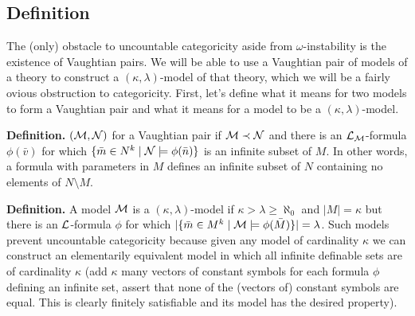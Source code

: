 \subsection{Definition}
The (only) obstacle to uncountable categoricity aside from \(\omega\)-instability is the existence of Vaughtian pairs.
We will be able to use a Vaughtian pair of models of a theory to construct a \((\kappa, \lambda)\)-model of that theory, which we will be a fairly ovious obstruction to categoricity.  
First, let's define what it means for two models to form a Vaughtian pair and what it means for a model to be a \((\kappa, \lambda)\)-model.

\textbf{Definition.} \((\mathcal{M}, \mathcal{N})\) for a Vaughtian pair if \(\mathcal{M} \prec \mathcal{N}\) and there is an \(\mathcal{L}_{\mathcal{M}}\)-formula \(\phi(\bar{v})\) for which
\(\{\bar{m} \in N^k \mid \mathcal{N} \models \phi(\bar{n})\}\) is an infinite subset of \(M\). 
In other words, a formula with parameters in \(M\) defines an infinite subset of \(N\) containing no elements of \(N \setminus M\).

\textbf{Definition.} A model \(\mathcal{M}\) is a \((\kappa, \lambda)\)-model if \(\kappa > \lambda \geq \aleph_0\) and \(|M| = \kappa\) but there is an \(\mathcal{L}\)-formula \(\phi\) for which
\(|\{\bar{m} \in M^k \mid \mathcal{M} \models \phi(\bar{M})\}| = \lambda\).
Such models prevent uncountable categoricity because given any model of cardinality \(\kappa\) we can construct an elementarily equivalent model in which all infinite definable sets are of cardinality \(\kappa\) (add \(\kappa\) many vectors of constant symbols for each formula \(\phi\) defining an infinite set, assert that none of the (vectors of) constant symbols are equal. This is clearly finitely satisfiable and its model has the desired property).

